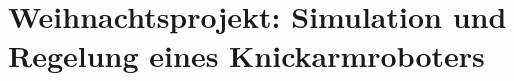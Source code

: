\documentclass{MSM_latex}
\author{M. Denkinger, S. Eyes, J. Schnitzler}
\begin{document}
\section{Weihnachtsprojekt: Simulation und Regelung eines Knickarmroboters}






\newpage






% 
\end{document}

